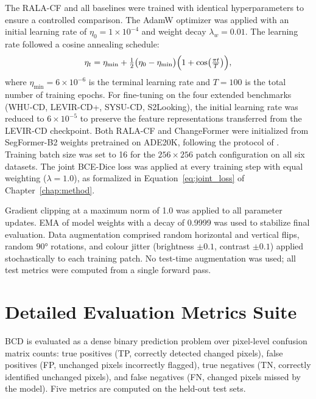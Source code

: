 The \ac{RALA-CF} and all baselines were trained with identical hyperparameters to
ensure a controlled comparison. The AdamW optimizer was applied with an initial
learning rate of $\eta_0 = 1 \times 10^{-4}$ and weight decay $\lambda_w = 0.01$.
The learning rate followed a cosine annealing schedule:
\begin{equation}
\eta_t = \eta_{\min} + \tfrac{1}{2}\bigl(\eta_0 - \eta_{\min}\bigr)
         \Bigl(1 + \cos\bigl(\tfrac{\pi t}{T}\bigr)\Bigr),
\label{eq:cosine_lr}
\end{equation}
where $\eta_{\min} = 6 \times 10^{-6}$ is the terminal learning rate and
$T = 100$ is the total number of training epochs. For fine-tuning on the four
extended benchmarks (WHU-CD, LEVIR-CD+, SYSU-CD, S2Looking), the initial learning
rate was reduced to $6 \times 10^{-5}$ to preserve the feature representations
transferred from the LEVIR-CD checkpoint. Both \ac{RALA-CF} and ChangeFormer were
initialized from SegFormer-B2 weights pretrained on ADE20K, following the protocol
of \cite{Bandara2022ChangeFormer}. Training batch size was set to 16 for the
$256 \times 256$ patch configuration on all six datasets. The joint \ac{BCE}-Dice
loss was applied at every training step with equal weighting ($\lambda = 1.0$),
as formalized in Equation~\ref{eq:joint_loss} of Chapter~\ref{chap:method}.

Gradient clipping at a maximum norm of 1.0 was applied to all parameter updates.
\ac{EMA} of model weights with a decay of 0.9999 was used to stabilize final
evaluation. Data augmentation comprised random horizontal and vertical flips,
random $90°$ rotations, and colour jitter (brightness $\pm 0.1$, contrast
$\pm 0.1$) applied stochastically to each training patch. No test-time
augmentation was used; all test metrics were computed from a single forward pass.


\section{Detailed Evaluation Metrics Suite}
\label{sec:exp-metrics}

\ac{BCD} is evaluated as a dense binary prediction problem over pixel-level
confusion matrix counts: true positives (\ac{TP}, correctly detected changed
pixels), false positives (\ac{FP}, unchanged pixels incorrectly flagged), true
negatives (\ac{TN}, correctly identified unchanged pixels), and false negatives
(\ac{FN}, changed pixels missed by the model). Five metrics are computed on the
held-out test sets.

